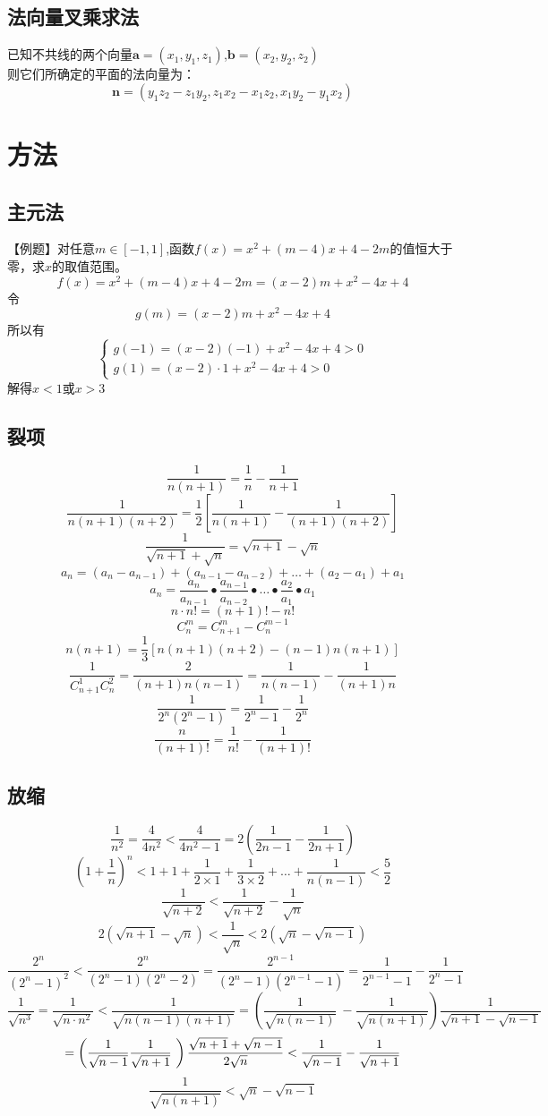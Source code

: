\documentclass[UTF8]{ctexart}
\begin{document}
		\subsection{法向量叉乘求法}
			已知不共线的两个向量$\boldsymbol{a}=(x_1,y_1,z_1)$,$\boldsymbol{b}=(x_2,y_2,z_2)$\\
			则它们所确定的平面的法向量为：
			\[\boldsymbol{n}=(y_1 z_2-z_1 y_2,z_1 x_2-x_1 z_2,x_1 y_2-y_1 x_2)\]
	\section{方法}
		\subsection{主元法}
			【例题】对任意$m\in [-1,1]$,函数$f(x)=x^2+(m-4)x+4-2m$的值恒大于零，求$x$的取值范围。\\
			\[f(x)=x^2+(m-4)x+4-2m=(x-2)m+x^2-4x+4\]
			令
			\[g(m)=(x-2)m+x^2-4x+4\]
			所以有
			\[\begin{cases}
				g(-1)=(x-2)(-1)+x^2-4x+4>0
				\\
				g(1)=(x-2)\cdot 1+x^2-4x+4>0
			\end{cases}\]
			解得$x<1 $或$ x>3$
		\subsection{裂项}
			\[\frac{1}{n(n+1)}=\frac{1}{n}-\frac{1}{n+1}\]
			\[\frac{1}{n(n+1)(n+2)}=\frac{1}{2}\left[\frac{1}{n(n+1)}-\frac{1}{(n+1)(n+2)}\right] \]
			\[\frac{1}{\sqrt{n+1}+\sqrt{n}}=\sqrt{n+1}-\sqrt{n}\]
			\[a_n=(a_n-a_{n-1})+(a_{n-1}-a_{n-2})+\dots+(a_2-a_1)+a_1\]
			\[a_n=\frac{a_n}{a_{n-1}}\bullet\frac{a_{n-1}}{a_{n-2}}\bullet\dots\bullet\frac{a_2}{a_1}\bullet a_1\]
			\[n\cdot n!=(n+1)!-n!\]
			\[C^{m}_{n}=C^{m}_{n+1}-C^{m-1}_{n}\]
			\[n(n+1)=\frac{1}{3}\left[n(n+1)(n+2)-(n-1)n(n+1)\right]\]
			\[\frac{1}{C^{1}_{n+1}C^{2}_{n}}=\frac{2}{(n+1)n(n-1)}=\frac{1}{n(n-1)}-\frac{1}{(n+1)n}\]
			\[\frac{1}{2^n(2^n-1)}=\frac{1}{2^n-1}-\frac{1}{2^n}\]
			\[\frac{n}{(n+1)!}=\frac{1}{n!}-\frac{1}{(n+1)!}\]
		\subsection{放缩}
			\[\frac{1}{n^2}=\frac{4}{4n^2}<\frac{4}{4n^2 -1}=2\left(\frac{1}{2n-1}-\frac{1}{2n+1}\right)\]
			\[\left(1+\frac{1}{n}\right)^n<1+1+\frac{1}{2\times 1}+\frac{1}{3\times 2}+\dots+\frac{1}{n(n-1)}<\frac{5}{2}\]
			\[\frac{1}{\sqrt{n+2}}<\frac{1}{\sqrt{n+2}}-\frac{1}{\sqrt{n}}\]
			\[2(\sqrt{n+1}-\sqrt{n})<\frac{1}{\sqrt{n}}<2(\sqrt{n}-\sqrt{n-1})\]
			\[\frac{2^n}{(2^n-1)^2}<\frac{2^n}{(2^n-1)(2^n-2)}=\frac{2^{n-1}}{(2^n-1)(2^{n-1}-1)}=\frac{1}{2^{n-1}-1}-\frac{1}{2^n-1}\]
			\[\frac{1}{\sqrt{n^3}}=\frac{1}{\sqrt{n\cdot n^2}}<\frac{1}{\sqrt{n(n-1)(n+1)}}=\left(\frac{1}{\sqrt{n(n-1)}}\
				-\frac{1}{\sqrt{n(n+1)}}\right)\frac{1}{\sqrt{n+1}-\sqrt{n-1}}\]
				\[=\left(\frac{1}{\sqrt{n-1}}\-\frac{1}{\sqrt{n+1}}\
				\right)\frac{\sqrt{n+1}+\sqrt{n-1}}{2\sqrt{n}}<\frac{1}{\sqrt{n-1}}-\frac{1}{\sqrt{n+1}}\]
			\[\frac{1}{\sqrt{n(n+1)}}<\sqrt{n}-\sqrt{n-1}\]
\end{document}

